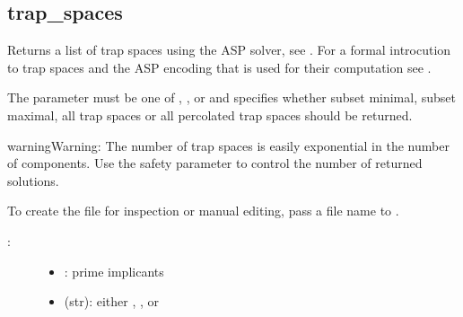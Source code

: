 \documentclass[letterpaper,10pt,english]{sphinxmanual}
\begin{document}
\subsection{trap\_spaces}
\label{\detokenize{AspSolver:id2}}\label{\detokenize{AspSolver:trap-spaces}}

\begin{fulllineitems}
\label{\detokenize{AspSolver:PyBoolNet.AspSolver.trap_spaces}}
Returns a list of trap spaces using the {\hyperref[\detokenize{Installation:installation-potassco}]{}} ASP solver, see {\hyperref[\detokenize{Bibliography:gebser2011}]{}}.
For a formal introcution to trap spaces and the ASP encoding that is used for their computation see {\hyperref[\detokenize{Bibliography:klarner2015trap}]{}}.

The parameter  must be one of , ,  or  and
specifies whether subset minimal, subset maximal, all trap spaces or all percolated trap spaces should be returned.

\begin{sphinxadmonition}{warning}{Warning:}
The number of trap spaces is easily exponential in the number of components.
Use the safety parameter  to control the number of returned solutions.
\end{sphinxadmonition}

To create the  file for inspection or manual editing, pass a file name to .
\begin{description}
\item[{:}] \leavevmode\begin{itemize}
\item {} 
: prime implicants

\item {} 
 (str): either , ,  or 


\end{itemize}
\end{description}
\end{fulllineitems}
\end{document}

